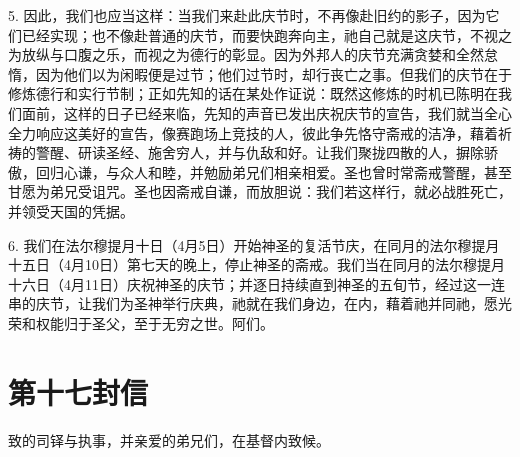 5. 因此，我们也应当这样：当我们来赴此庆节时，不再像赴旧约的影子，因为它们已经实现；也不像赴普通的庆节，而要快跑奔向主，祂自己就是这庆节，不视之为放纵与口腹之乐，而视之为德行的彰显。因为外邦人的庆节充满贪婪和全然怠惰，因为他们以为闲暇便是过节；他们过节时，却行丧亡之事。但我们的庆节在于修炼德行和实行节制；正如先知的话在某处作证说：既然这修炼的时机已陈明在我们面前，这样的日子已经来临，先知的声音已发出庆祝庆节的宣告，我们就当全心全力响应这美好的宣告，像赛跑场上竞技的人，彼此争先恪守斋戒的洁净，藉着祈祷的警醒、研读圣经、施舍穷人，并与仇敌和好。让我们聚拢四散的人，摒除骄傲，回归心谦，与众人和睦，并勉励弟兄们相亲相爱。圣也曾时常斋戒警醒，甚至甘愿为弟兄受诅咒。圣也因斋戒自谦，而放胆说：我们若这样行，就必战胜死亡，并领受天国的凭据。\par

6. 我们在法尔穆提月十日（4月5日）开始神圣的复活节庆，在同月的法尔穆提月十五日（4月10日）第七天的晚上，停止神圣的斋戒。我们当在同月的法尔穆提月十六日（4月11日）庆祝神圣的庆节；并逐日持续直到神圣的五旬节，经过这一连串的庆节，让我们为圣神举行庆典，祂就在我们身边，在内，藉着祂并同祂，愿光荣和权能归于圣父，至于无穷之世。阿们。\par

\par



\section{第十七封信}

\par

致的司铎与执事，并亲爱的弟兄们，在基督内致候。\par

